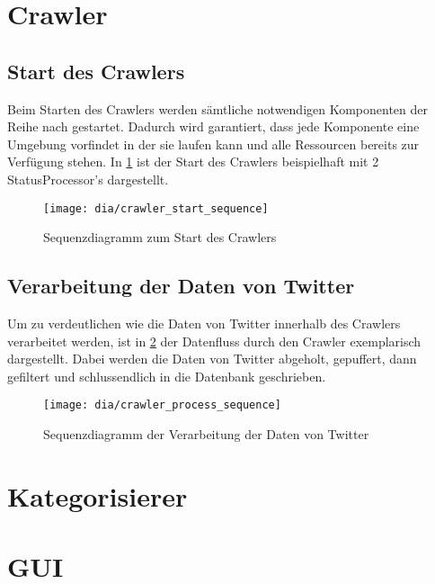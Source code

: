 \section{Crawler}

\subsection{Start des Crawlers}
Beim Starten des Crawlers werden sämtliche notwendigen Komponenten der Reihe nach gestartet. Dadurch wird garantiert, dass jede Komponente eine Umgebung vorfindet in der sie laufen kann und alle Ressourcen bereits zur Verfügung stehen. In \cref{fig:crawler_start} ist der Start des Crawlers beispielhaft mit 2 StatusProcessor's dargestellt.

\begin{figure}[htb]
\texttt{[image: dia/crawler\_start\_sequence]}
\caption{Sequenzdiagramm zum Start des Crawlers}
\label{fig:crawler_start}
\end{figure}

\subsection{Verarbeitung der Daten von Twitter}
Um zu verdeutlichen wie die Daten von Twitter innerhalb des Crawlers verarbeitet werden, ist in \cref{fig:crawler_process} der Datenfluss durch den Crawler exemplarisch dargestellt. Dabei werden die Daten von Twitter abgeholt, gepuffert, dann gefiltert und schlussendlich in die Datenbank geschrieben.

\begin{figure}[htb]
\texttt{[image: dia/crawler\_process\_sequence]}
\caption{Sequenzdiagramm der Verarbeitung der Daten von Twitter}
\label{fig:crawler_process}
\end{figure}

\section{Kategorisierer}


\section{GUI}